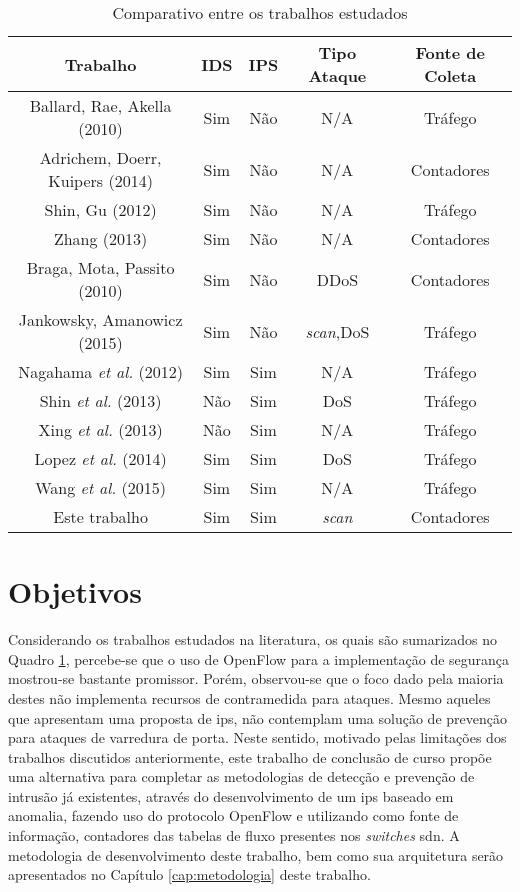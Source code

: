 \begin{table}[H]
  \centering
  \caption{Comparativo entre os trabalhos estudados}
  \begin{tabular}{|c|c|c|c|c|} \hline
	\textbf{Trabalho} & \textbf{IDS} & \textbf{IPS} & \textbf{Tipo Ataque} & \textbf{Fonte de Coleta} \\ \hline
	Ballard, Rae, Akella (2010)  & Sim & Não & N/A & Tráfego\\ \hline
	Adrichem, Doerr, Kuipers (2014) & Sim & Não & N/A & Contadores\\ \hline
	Shin, Gu (2012)     & Sim & Não & N/A & Tráfego\\ \hline
	Zhang (2013)    & Sim & Não & N/A & Contadores\\ \hline
	Braga, Mota, Passito (2010)    & Sim & Não & DDoS & Contadores\\ \hline
	Jankowsky, Amanowicz (2015) & Sim & Não & \textit{scan},DoS & Tráfego \\ \hline
	Nagahama \textit{et al.} (2012) & Sim & Sim & N/A & Tráfego\\ \hline
	Shin \textit{et al.} (2013)    & Não & Sim & DoS & Tráfego\\ \hline
	Xing \textit{et al.} (2013)     & Não & Sim & N/A & Tráfego \\ \hline
	Lopez \textit{et al.} (2014)    & Sim & Sim & DoS & Tráfego \\ \hline
	Wang \textit{et al.} (2015)     & Sim & Sim & N/A & Tráfego \\ \hline
	Este trabalho & Sim & Sim & \textit{scan} & Contadores \\ \hline
  \end{tabular}
  \label{tab:trabalhos}
\end{table}

\section{Objetivos}
\label{sec:objetivos}

Considerando os trabalhos estudados na literatura, os quais são sumarizados no Quadro \ref{tab:trabalhos}, percebe-se que o uso de OpenFlow para a implementação de segurança mostrou-se bastante promissor. Porém, observou-se que o foco dado pela maioria destes não implementa recursos de contramedida para ataques. Mesmo aqueles que apresentam uma proposta de \gls{ips}, não contemplam uma solução de prevenção para ataques de varredura de porta.
Neste sentido, motivado pelas limitações dos trabalhos discutidos anteriormente, este trabalho de conclusão de curso propõe uma alternativa para completar as metodologias de detecção e prevenção de intrusão já existentes, através do desenvolvimento de um \gls{ips} baseado em anomalia, fazendo uso do protocolo OpenFlow e utilizando como fonte de informação, contadores das tabelas de fluxo presentes nos \textit{switches} \gls{sdn}. A metodologia de desenvolvimento deste trabalho, bem como sua arquitetura serão apresentados no Capítulo \ref{cap:metodologia} deste trabalho.